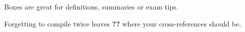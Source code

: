 \documentclass{article}
\begin{document}
\begin{notebox}
  Boxes are great for definitions, summaries or exam tips.
\end{notebox}

\begin{warnbox}
  Forgetting to compile twice leaves \textbf{??} where your
  cross-references should be.
\end{warnbox}
\end{document}
